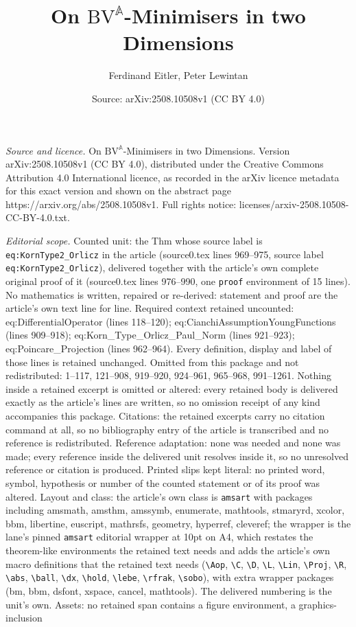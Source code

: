 \documentclass[10pt,a4paper]{amsart}
\title[On $\mathrm{BV}^{\mathbb{A}}$-Minimisers in two Dimensions]{On $\mathrm{BV}^{\mathbb{A}}$-Minimisers in two Dimensions}
\author{Ferdinand Eitler, Peter Lewintan}
\date{Source: arXiv:2508.10508v1 (CC BY 4.0)}
\begin{document}
\maketitle

\noindent\emph{Source and licence.} On $\mathrm{BV}^{\mathbb{A}}$-Minimisers in two Dimensions. Version arXiv:2508.10508v1 (CC BY 4.0), distributed under the Creative Commons Attribution 4.0 International licence, as recorded in the arXiv licence metadata for this exact version and shown on the abstract page https://arxiv.org/abs/2508.10508v1. Full rights notice: licenses/arxiv-2508.10508-CC-BY-4.0.txt.\par\smallskip

\noindent\textit{Editorial scope.} Counted unit: the Thm whose source label is \texttt{eq:KornType2\_Orlicz} in the article (source0.tex lines 969--975, source label \texttt{eq:KornType2\_Orlicz}), delivered together with the article's own complete original proof of it (source0.tex lines 976--990, one \texttt{proof} environment of 15 lines). No mathematics is written, repaired or re-derived: statement and proof are the article's own text line for line. Required context retained uncounted: eq:DifferentialOperator (lines 118--120); eq:CianchiAssumptionYoungFunctions (lines 909--918); eq:Korn\_Type\_Orlicz\_Paul\_Norm (lines 921--923); eq:Poincare\_Projection (lines 962--964). Every definition, display and label of those lines is retained unchanged. Omitted from this package and not redistributed: 1--117, 121--908, 919--920, 924--961, 965--968, 991--1261. Nothing inside a retained excerpt is omitted or altered: every retained body is delivered exactly as the article's lines are written, so no omission receipt of any kind accompanies this package. Citations: the retained excerpts carry no citation command at all, so no bibliography entry of the article is transcribed and no reference is redistributed. Reference adaptation: none was needed and none was made; every reference inside the delivered unit resolves inside it, so no unresolved reference or citation is produced. Printed slips kept literal: no printed word, symbol, hypothesis or number of the counted statement or of its proof was altered. Layout and class: the article's own class is \texttt{amsart} with packages including amsmath, amsthm, amssymb, enumerate, mathtools, stmaryrd, xcolor, bbm, libertine, euscript, mathrsfs, geometry, hyperref, cleveref; the wrapper is the lane's pinned \texttt{amsart} editorial wrapper at 10pt on A4, which restates the theorem-like environments the retained text needs and adds the article's own macro definitions that the retained text needs (\texttt{\textbackslash Aop}, \texttt{\textbackslash C}, \texttt{\textbackslash D}, \texttt{\textbackslash L}, \texttt{\textbackslash Lin}, \texttt{\textbackslash Proj}, \texttt{\textbackslash R}, \texttt{\textbackslash abs}, \texttt{\textbackslash ball}, \texttt{\textbackslash dx}, \texttt{\textbackslash hold}, \texttt{\textbackslash lebe}, \texttt{\textbackslash rfrak}, \texttt{\textbackslash sobo}), with extra wrapper packages (bm, bbm, dsfont, xspace, cancel, mathtools). The delivered numbering is the unit's own. Assets: no retained span contains a figure environment, a graphics-inclusion 
\end{document}
